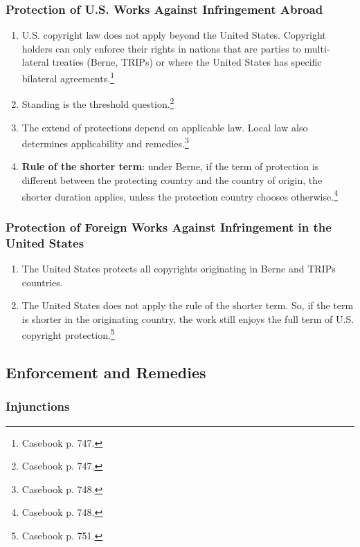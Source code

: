 \subsubsection{Protection of U.S. Works Against Infringement Abroad}

\begin{enumerate}
    \item U.S. copyright law does not apply beyond the United States. 
    Copyright holders can only enforce their rights in nations that are 
    parties to multi-lateral treaties (Berne, TRIPs) or where the United 
    States has specific bilateral agreements.\footnote{Casebook p. 747.}
    \item Standing is the threshold question.\footnote{Casebook p. 747.}
    \item The extend of protections depend on applicable law. Local law also 
    determines applicability and remedies.\footnote{Casebook p. 748.}
    \item \textbf{Rule of the shorter term}: under Berne, if the term of 
    protection is different between the protecting country and the country of 
    origin, the shorter duration applies, unless the protection country 
    chooses otherwise.\footnote{Casebook p. 748.}
\end{enumerate}

\subsubsection{Protection of Foreign Works Against Infringement in the United 
States}

\begin{enumerate}
    \item The United States protects all copyrights originating in Berne and 
    TRIPs countries.
    \item The United States does not apply the rule of the shorter term. So, 
    if the term is shorter in the originating country, the work still enjoys 
    the full term of U.S. copyright protection.\footnote{Casebook p. 751.}
\end{enumerate}

\subsection{Enforcement and Remedies}

\subsubsection{Injunctions}

